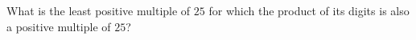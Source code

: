 What is the least positive multiple of $25$ for which the product of its digits is also a positive multiple of $25$?
